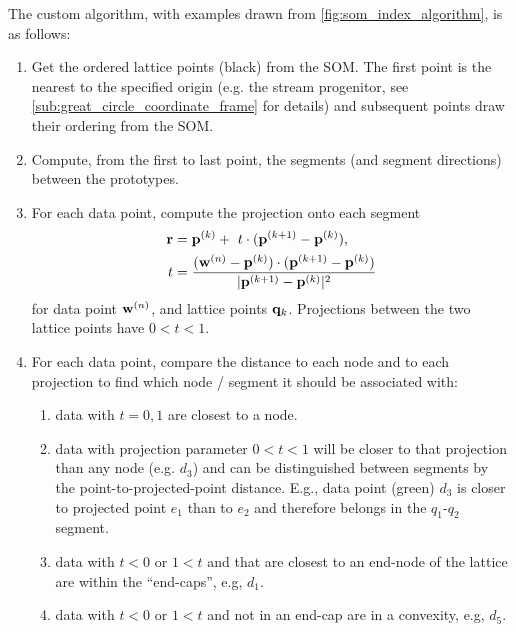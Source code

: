 \documentclass[fleqn,usenatbib]{mnras}
\begin{document}
      The custom algorithm, with examples drawn from
      \autoref{fig:som_index_algorithm}, is as follows:
      \begin{enumerate}[label={(\bfseries \arabic*):}, leftmargin=*]
      \itemsep0.5em
        \item Get the ordered lattice points (black) from the SOM. The first
        point is the nearest to the specified origin (e.g. the stream
        progenitor, see \autoref{sub:great_circle_coordinate_frame} for details)
        and subsequent points draw their ordering from the SOM.
        \item Compute, from the first to last point, the segments (and segment
        directions) between the prototypes.
        \item For each data point, compute the projection onto each segment
            \begin{align}
              \mathbf{r} &= \mathbf{p}^{(k)} + \ t \cdot (\mathbf{p}^{(k+1)} - \mathbf{p}^{(k)}),
              \\
              t &= \frac{(\mathbf{w}^{(n)}-\mathbf{p}^{(k)}) \cdot (\mathbf{p}^{(k+1)}-\mathbf{p}^{(k)})}{|\mathbf{p}^{(k+1)}-\mathbf{p}^{(k)}|^2}
            \end{align}
            for data point $\mathbf{w}^{(n)}$, and lattice points $\mathbf{q}_k$.
            Projections between the two lattice points have $0<t<1$.
        \item For each data point, compare the distance to each node and to each
        projection to find which node / segment it should be associated with:
          \begin{enumerate}[label={(\bfseries \arabic*):}, leftmargin=*]
          \itemsep0.5em
              \item data with $t=0,1$ are closest to a node.
              \item data with projection parameter $0<t<1$ will be closer to
              that projection than any node (e.g. $d_3$) and can be
              distinguished between segments by the point-to-projected-point
              distance. E.g., data point (green) $d_3$ is closer to projected
              point $e_1$ than to $e_2$ and therefore belongs in the $q_1$-$q_2$
              segment.
              \item data with $t < 0$ or $1 < t$ and that are closest to an
              end-node of the lattice are within the ``end-caps'', e.g, $d_1$.
              \item data with $t < 0$ or $1 < t$ and not in an end-cap are in a
              convexity, e.g, $d_5$.

\end{enumerate}
\end{enumerate}
\end{document}

